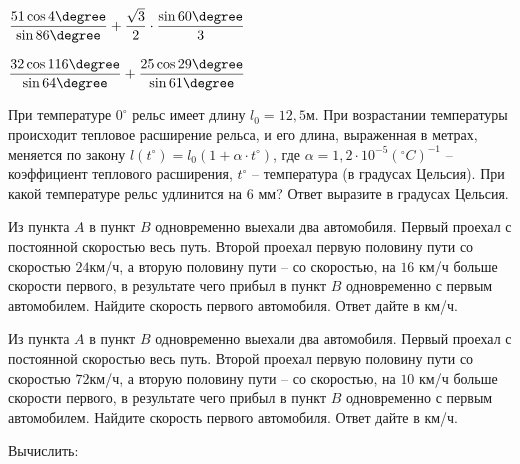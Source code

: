 \begin{class}[number=2]
\begin{listofex}
\begin{enumcols}[itemcolumns=2]
			\item \( \dfrac{51\cos 4\degree}{\sin 86\degree}+\dfrac{\sqrt{3}}{2}\cdot\dfrac{\sin 60\degree}{3} \)
			\item \( \dfrac{32\cos116\degree}{\sin 64\degree}+\dfrac{25\cos 29\degree}{\sin 61\degree} \)
		\end{enumcols}
		\item При температуре \( 0^{\circ}  \) рельс имеет длину \( l_0=12,5 \)м. При возрастании температуры происходит тепловое расширение рельса, и его длина, выраженная в метрах, меняется по закону \( l(t^{\circ})=l_0(1+\alpha\cdot t^{\circ}) \), где  \( \alpha=1,2\cdot 10^{-5}(^{\circ}C)^{-1} \) – коэффициент теплового расширения, \( t^{\circ} \) – температура (в градусах Цельсия). При какой температуре рельс удлинится на \( 6 \) мм? Ответ выразите в градусах Цельсия.
		\item  Из пункта \( A \) в пункт \( B \) одновременно выехали два автомобиля. Первый проехал с постоянной скоростью весь путь. Второй проехал первую половину пути со скоростью \( 24 \)км/ч, а вторую половину пути – со скоростью, на \(16\) км/ч больше скорости первого, в результате чего прибыл в пункт \( B \) одновременно с первым автомобилем. Найдите скорость первого автомобиля. Ответ дайте в км/ч.
	\end{listofex}
\end{class}
\begin{homework}[number=1]
	\begin{listofex}
		\item Из пункта \( A \) в пункт \( B \) одновременно выехали два автомобиля. Первый проехал с постоянной скоростью весь путь. Второй проехал первую половину пути со скоростью \( 72 \)км/ч, а вторую половину пути – со скоростью, на \(10\) км/ч больше скорости первого, в результате чего прибыл в пункт \( B \) одновременно с первым автомобилем. Найдите скорость первого автомобиля. Ответ дайте в км/ч.
		\item Вычислить:
		\begin{enumcols}[itemcolumns=2]
			\item {}
			\item {}
		\end{enumcols}
	\end{listofex}
\end{homework}
